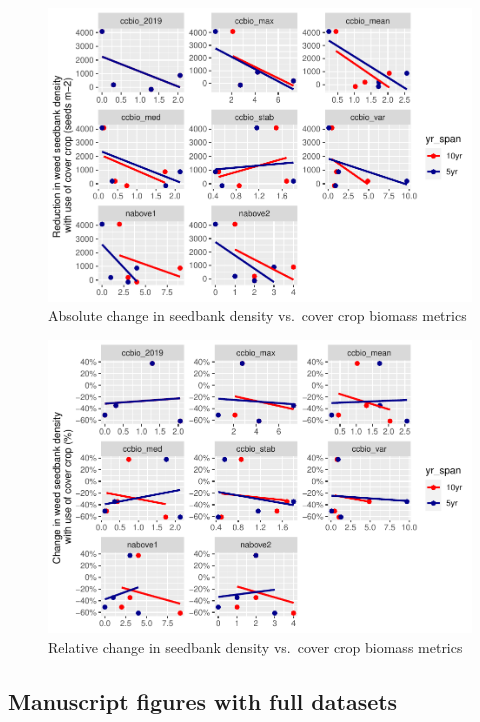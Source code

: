 \documentclass[]{article}
\begin{document}
\begin{figure}
\centering
\includegraphics{supp-mat_files/figure-latex/unnamed-chunk-1-1.pdf}
\caption{Absolute change in seedbank density vs.~cover crop biomass
metrics}
\end{figure}

\begin{figure}
\centering
\includegraphics{supp-mat_files/figure-latex/unnamed-chunk-2-1.pdf}
\caption{Relative change in seedbank density vs.~cover crop biomass
metrics}
\end{figure}

\newpage

\hypertarget{manuscript-figures-with-full-datasets}{%
\subsection{Manuscript figures with full
datasets}\label{manuscript-figures-with-full-datasets}}
\end{document}
